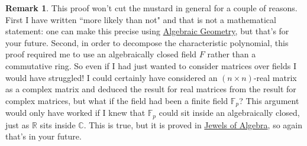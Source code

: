 \documentclass[11pt]{amsbook}
\theoremstyle{definition}
\newtheorem{rem}[theorem]{Remark}
\begin{document}
\begin{rem}This proof won't cut the mustard in general for a couple of reasons. First I have written ``more likely than not" and that is not a mathematical statement: one can make this precise using \href{http://www.drps.ed.ac.uk/14-15/dpt/cxmath11120.htm}{Algebraic Geometry}, but that's for your future. Second, in order to decompose the characteristic polynomial, this proof required me to use an algebraically closed field $F$ rather than a commutative ring. So even if I had just wanted to consider matrices over fields I would have struggled! I could certainly have considered an $(n\times n)$-real matrix as a complex matrix and deduced the result for real matrices from the result for complex matrices, but what if the field had been a finite field $\mathbb{F}_p$? This argument would only have worked if I knew that $\mathbb{F}_p$ could sit inside an algebraically closed, just as $\mathbb{R}$ sits inside $\mathbb{C}$. This is true, but it is proved in \href{http://www.drps.ed.ac.uk/14-15/dpt/cxmath10050.htm}{Jewels of Algebra}, so again that's in your future.
\end{rem}
\end{document}

